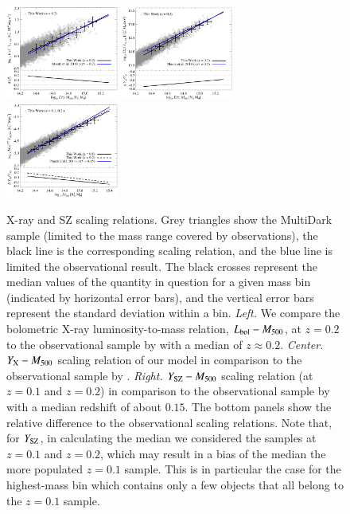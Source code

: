 \documentclass[traditabstract]{aa}
\begin{document}
\begin{figure}[t]
\centering
\includegraphics[width=0.33\textwidth]{figures/lx_m.eps}
\includegraphics[width=0.33\textwidth]{figures/yx_m.eps}
\includegraphics[width=0.33\textwidth]{figures/sz_m.eps}
\caption{X-ray and SZ scaling relations.  Grey triangles show the MultiDark
  sample (limited to the mass range covered by observations), the black line is
  the corresponding scaling relation, and the blue line is limited the
  observational result. The black crosses represent the median values of the
  quantity in question for a given mass bin (indicated by horizontal error
  bars), and the vertical error bars represent the standard deviation within a
  bin.  \emph{Left.} We compare the bolometric X-ray luminosity-to-mass
  relation, $L_{\rm{bol}}-M_{500}$, at $z=0.2$ to the observational sample by
  \cite{2010MNRAS.406.1773M} with a median of $z \approx 0.2$. \emph{Center.}
  $Y_{\rm{X}}-M_{500}$ scaling relation of our model in comparison to the
  observational sample by \cite{2010MNRAS.406.1773M}. \emph{Right.}
  $Y_{\rm{SZ}}-M_{500}$ scaling relation (at $z=0.1$ and $z=0.2$) in comparison
  to the observational sample by \cite{2011A&A...536A..11P} with a median
  redshift of about $0.15$.  The bottom panels show the relative difference to
  the observational scaling relations.  Note that, for $Y_{\rm{SZ}}$, in
  calculating the median we considered the samples at $z=0.1$ and $z=0.2$, which
  may result in a bias of the median the more populated $z=0.1$ sample. This is
  in particular the case for the highest-mass bin which contains only a few
  objects that all belong to the $z=0.1$ sample.}
\label{fig:X_LM}
\end{figure}
\end{document}
